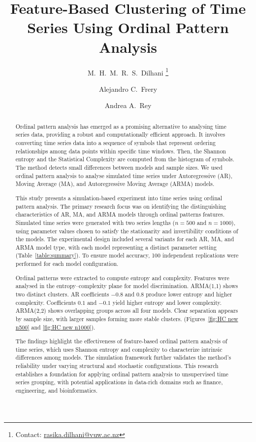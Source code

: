 \documentclass[11pt,a4paper]{article}
\title{\vspace{-1cm}Feature-Based Clustering of Time Series Using Ordinal Pattern Analysis\vspace{-0.3cm}}
\author[1]{M.\ H.\ M.\ R.\ S.\ Dilhani \thanks{Contact: \href{mailto:rasika.dilhani@vuw.ac.nz}{rasika.dilhani@vuw.ac.nz}}}
\author[1]{Alejandro C.\ Frery}
\author[2]{Andrea A.\ Rey}
\affil[1]{School of Mathematics and Statistics, Victoria University of Wellington, New Zealand}
\affil[2]{Laboratorio de Investigación y Desarrollo Experimental en Computación (LIDEC), Instituto de Tecnología e Ingeniería, Universidad Nacional de Hurlingham (UNAHUR), Argentina}
\date{}
\begin{document}
	\maketitle
	\vspace{-0.5cm}
	
	\begin{abstract}
	
	
Ordinal pattern analysis has emerged as a promising alternative to analysing time series data, providing a robust and computationally efficient approach. 
It involves converting time series data into a sequence of symbols that represent ordering relationships among data points within specific time windows.  
Then, the Shannon entropy and the Statistical Complexity are computed from the histogram of symbols. 
The method detects small differences between models and sample sizes.
We used ordinal pattern analysis to analyse simulated time series under Autoregressive (AR), Moving Average (MA), and Autoregressive Moving Average (ARMA) models. 
	
This study presents a simulation-based experiment into time series using ordinal pattern analysis. 
The primary research focus was on identifying the distinguishing characteristics of AR, MA, and ARMA models through ordinal patterns features. 
Simulated time series were generated with two series lengths ($n = 500$ and $n = 1000$), using parameter values chosen to satisfy the stationarity and invertibility conditions of the models. 
The experimental design included several variants for each AR, MA, and ARMA model type, with each model representing a distinct parameter setting (Table~\ref{table:summary}). 
To ensure model accuracy, 100 independent replications were performed for each model configuration.

Ordinal patterns were extracted to compute entropy and complexity. 
Features were analysed in the entropy–complexity plane for model discrimination. 
ARMA(1,1) shows two distinct clusters.
AR coefficients $-0.8$ and $0.8$ produce lower entropy and higher complexity. 
Coefficients $0.1$ and $-0.1$ yield higher entropy and lower complexity. 
ARMA(2,2) shows overlapping groups across all four models. 
Clear separation appears by sample size, with larger samples forming more stable clusters. (Figures~\ref{fig:HC new n500} and \ref{fig:HC new n1000}).

The findings highlight the effectiveness of feature-based ordinal pattern analysis of time series, which uses Shannon entropy and complexity to characterize intrinsic differences among models. 
The simulation framework further validates the method’s reliability under varying structural and stochastic configurations. 
This research establishes a foundation for applying ordinal pattern analysis to unsupervised time series grouping, with potential applications in data-rich domains such as finance, engineering, and bioinformatics.

\end{abstract}
\end{document}
